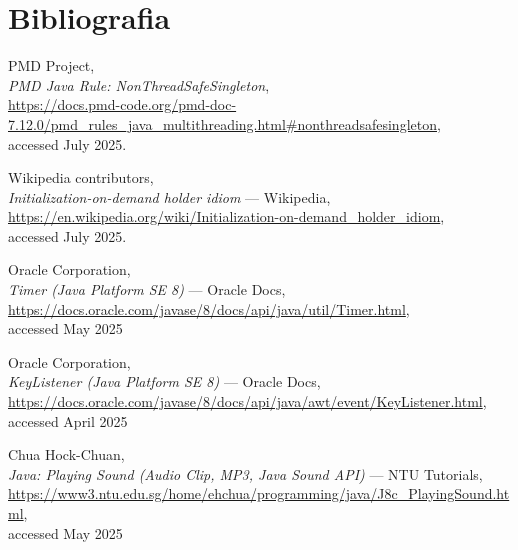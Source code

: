 \documentclass[a4paper,12pt]{report}
\begin{document}
\chapter{Bibliografia}
\begin{thebibliography}{9}

    PMD Project,\\
    \emph{PMD Java Rule: NonThreadSafeSingleton},\\
    \url{https://docs.pmd-code.org/pmd-doc-7.12.0/pmd_rules_java_multithreading.html#nonthreadsafesingleton},\\
    accessed July 2025.
    
    Wikipedia contributors,\\
    \emph{Initialization-on-demand holder idiom} --- Wikipedia,\\
    \url{https://en.wikipedia.org/wiki/Initialization-on-demand_holder_idiom},\\
    accessed July 2025.

    
    Oracle Corporation,\\
    \emph{Timer (Java Platform SE 8)} --- Oracle Docs,\\
    \url{https://docs.oracle.com/javase/8/docs/api/java/util/Timer.html},\\
    accessed May 2025

    Oracle Corporation,\\
    \emph{KeyListener (Java Platform SE 8)} --- Oracle Docs,\\
    \url{https://docs.oracle.com/javase/8/docs/api/java/awt/event/KeyListener.html},\\
    accessed April 2025

    Chua Hock-Chuan,\\
    \emph{Java: Playing Sound (Audio Clip, MP3, Java Sound API)} --- NTU Tutorials,\\
    \url{https://www3.ntu.edu.sg/home/ehchua/programming/java/J8c_PlayingSound.html},\\
    accessed May 2025

    \end{thebibliography}
\end{document}
